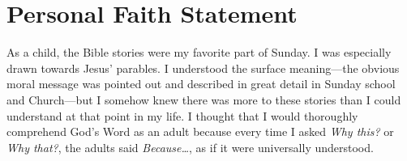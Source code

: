 \documentclass{article}%
\title{}
\author{Dr. Karen Tatum}
\begin{document}
\pagestyle{empty}
\section*{Personal Faith Statement}

As a child, the Bible stories were my favorite part of Sunday. %
I was especially drawn towards Jesus' parables. 
I understood the surface meaning---the obvious moral message was pointed out and described in great detail in Sunday school and Church---but I somehow knew there was more to these stories than I could understand at that point in my life. 
I thought that I would thoroughly comprehend God's Word as an adult because every time I asked \emph{Why this?} or \emph{Why that?}, the adults said \emph{Because\dots}, as if it were universally understood. %

 
 
\end{document}
